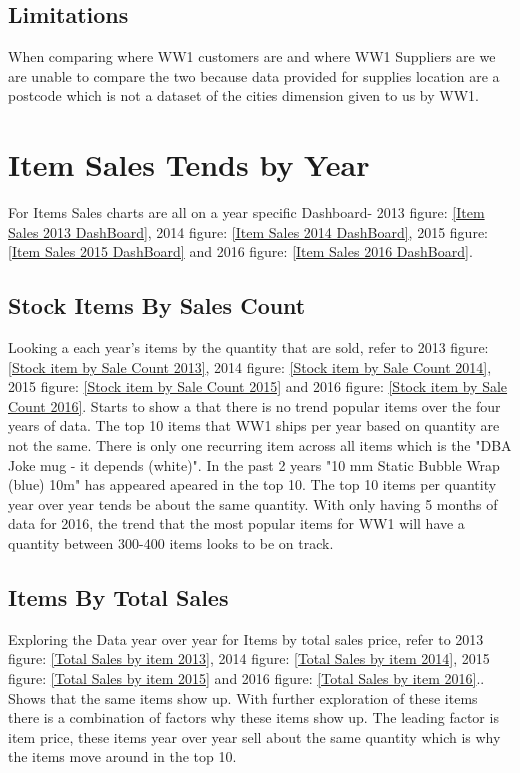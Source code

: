 \documentclass[12pt]{article}
\begin{document}
\subsection{Limitations}
\begin{flushleft}
    When comparing where WW1 customers are and where WW1 Suppliers are we are unable to compare the two because data provided for supplies location are a postcode which is not a dataset of the cities dimension given to us by WW1.
\end{flushleft}


\section{Item Sales Tends by Year}

\begin{flushleft}
    For Items Sales charts are all on a year specific Dashboard- 2013 figure: \ref{Item Sales 2013 DashBoard}, 2014 figure: \ref{Item Sales 2014 DashBoard}, 2015 figure: \ref{Item Sales 2015 DashBoard} and 2016 figure: \ref{Item Sales 2016 DashBoard}.
\end{flushleft}

\subsection{Stock Items By Sales Count}

\begin{flushleft}
Looking a each year's items by the quantity that are sold, refer to 2013 figure: \ref{Stock item by Sale Count 2013}, 2014 figure: \ref{Stock item by Sale Count 2014}, 2015 figure: \ref{Stock item by Sale Count 2015} and 2016 figure: \ref{Stock item by Sale Count 2016}. Starts to show a that there is no trend popular items over the four years of data. The top 10 items that WW1 ships per year based on quantity are not the same. There is only one recurring item across all items which is the "DBA Joke mug - it depends (white)". In the past 2 years "10 mm Static Bubble Wrap (blue) 10m" has appeared apeared in the top 10. The top 10 items per quantity year over year tends be about the same quantity. With only having 5 months of data for 2016, the trend that the most popular items for WW1 will have a quantity between 300-400 items looks to be on track.
\end{flushleft}

\subsection{Items By Total Sales}
\begin{flushleft}
Exploring the Data year over year for Items by total sales price, refer to 2013 figure: \ref{Total Sales by item 2013}, 2014 figure: \ref{Total Sales by item 2014}, 2015 figure: \ref{Total Sales by item 2015} and 2016 figure: \ref{Total Sales by item 2016}.. Shows that the same items show up. With further exploration of these items there is a combination of factors why these items show up. The leading factor is item price, these items year over year sell about the same quantity which is why the items move around in the top 10.

\end{flushleft}
\end{document}
